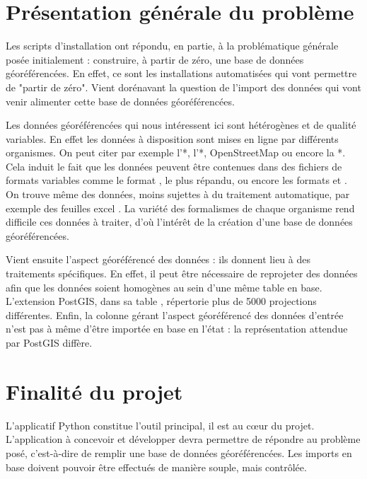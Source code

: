 \section{Présentation générale du problème}

Les scripts d'installation ont répondu, en partie, à la problématique générale posée initialement : construire, à partir de zéro, une base de données géoréférencées. En effet, ce sont les installations automatisées qui vont permettre de "partir de zéro". Vient dorénavant la question de  l'import des données qui vont venir alimenter cette base de données géoréférencées.

Les données géoréférencées qui nous intéressent ici sont hétérogènes et de qualité variables. En effet les données à disposition sont mises en ligne par différents organismes. On peut citer par exemple l'*, l'*, OpenStreetMap ou encore la *. Cela induit le fait que les données peuvent être contenues dans des fichiers de formats variables comme le format , le plus répandu, ou encore les formats  et . On trouve même des données, moins sujettes à du traitement automatique, par exemple des feuilles excel . La variété des formalismes de chaque organisme rend difficile ces données à traiter, d'où l'intérêt de la création d'une base de données géoréférencées.

Vient ensuite l'aspect géoréférencé des données : ils donnent lieu à des traitements spécifiques. En effet, il peut être nécessaire de reprojeter des données afin que les données soient homogènes au sein d'une même table en base. L'extension PostGIS, dans sa table , répertorie plus de 5000 projections différentes. Enfin, la colonne  gérant l'aspect géoréférencé des données d'entrée n'est pas à même d'être importée en base en l'état : la représentation attendue par PostGIS diffère.

\section{Finalité du projet}

L'applicatif Python constitue l'outil principal, il est au cœur du projet. L'application à concevoir et développer devra permettre de répondre au problème posé, c'est-à-dire de remplir une base de données géoréférencées. Les imports en base doivent pouvoir être effectués de manière souple, mais contrôlée.

